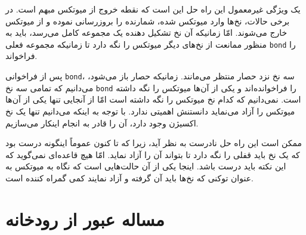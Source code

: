 \documentclass{book}
\begin{document}
    یک ویژگی غیرمعمول این راه حل این است که نقطه خروج از میوتکس مبهم است. در برخی حالات، نخ‌ها وارد میوتکس شده، شمارنده را 
    بروزرسانی نموده و از میوتکس خارج می‌شوند. امّا زمانیکه آن نخ تشکیل دهنده یک مجموعه کامل می‌رسد، باید به منظور ممانعت از نخ‌های دیگر 
    میوتکس را نگه دارد تا زمانیکه مجموعه فعلی {\tt bond} را فراخواند. 

    پس از فراخوانی {\tt bond}، سه نخ نزد حصار منتظر می‌مانند. زمانیکه حصار باز می‌شود، می‌دانیم که تمامی سه نخ {\tt bond} را فراخوانده‌اند و 
    یکی از آن‌ها میوتکس را نگه داشته است. نمی‌دانیم که  کدام نخ میوتکس را نگه داشته است امّا 
    از آنجایی تنها یکی از آن‌ها میوتکس را آزاد می‌نماید دانستنش اهمیتی ندارد. با توجه به اینکه می‌دانیم تنها یک نخ اکسیژن وجود دارد، آن را قادر به انجام اینکار 
    می‌سازیم. 

    ممکن است این راه حل نادرست به نظر آید، زیرا که تا کنون عموماً اینگونه درست بود که یک نخ باید قفلی را نگه دارد تا بتواند آن را آزاد نماید. 
    امّا هیچ قاعده‌ای نمی‌گوید که  این نکته باید درست باشد. اینجا یکی از آن حالت‌هایی است که نگاه به میوتکس به عنوان توکنی که نخ‌ها باید آن گرفته و آزاد 
    نمایند کمی گمراه کننده است. 
    

\section {مساله عبور از رودخانه}
\end{document}

